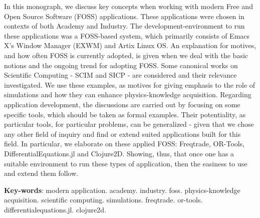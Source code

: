 \documentclass[
12pt,				%
openright,			%
oneside,			%
a4paper,			%
brazil,				%
english,			  %
]{abntex2}
\begin{document}
\setlength{\absparsep}{18pt} %
\begin{resumo}
In this monograph, we discuss key concepts when working
with modern Free and Open Source Software (FOSS) applications. These
applications were chosen in contexts of both Academy and Industry. The
development-environment to run these applications was a FOSS-based
system, which primarily consists of Emacs X's Window Manager (EXWM)
and Artix Linux OS.
An explanation for motives, and how often FOSS is currently adopted, is
given when we deal with the basic notions and the ongoing trend for
adopting FOSS.
Some canonical works on Scientific Computing - SCIM and SICP - are
considered and their relevance investigated. We use these examples, as
motives for giving emphasis to the role of simulations and how they
can enhance physics-knowledge acquisition.
Regarding application development, the discussions are carried out by
focusing on some specific tools, which should be taken as formal
examples. Their potentiality, as particular tools, for particular
problems, can be generalized - given that we chose any other field of
inquiry and find or extend suited applications built for this field.
In particular, we elaborate on these applied FOSS: Freqtrade, OR-Tools,
DifferentialEquations.jl and Clojure2D. Showing, thus, that once one has a
suitable environment to run these types of application, then the easiness to use
and extend them follow.

\textbf{Key-words}: modern application. academy. industry. foss. physics-knowledge
acquisition. scientific computing. simulations. freqtrade. or-tools. differentialequations.jl. clojure2d.
\end{resumo}
\end{document}
